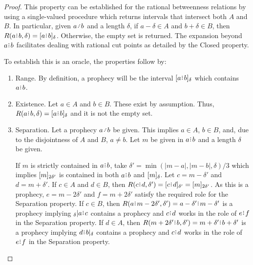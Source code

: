 \documentclass[12pt]{article}
\begin{document}
\begin{proof}
This property can be established for the rational betweenness relations by using a single-valued procedure which returns intervals that intersect both $A$ and $B$. In particular, given $a \lte b$ and a length $\delta$, if $a-\delta \in A$ and $b+\delta \in B$, then $R(a\rint b, \delta) = \halo{a\rint b}$. Otherwise, the empty set is returned. The expansion beyond $a\rint b$ facilitates dealing with rational cut points as detailed by the Closed property. 

To establish this is an oracle, the properties follow by:  
\begin{enumerate}
    \item Range. By definition, a prophecy will be the interval $\halo{a\rint b}$ which contains $a\rint b$. 
    
    \item Existence. Let $a \in A$ and $b \in B$. These exist by assumption. Thus, $R(a\rint b, \delta)= \halo{a\rint b}$  and it is not the empty set.
    
    \item Separation. Let a prophecy $a \lte b$ be given. This implies $a \in A$, $b \in B$, and, due to the disjointness of $A$ and $B$, $a \neq b$. Let $m$ be given in $a\rint b$ and a length $\delta$ be given. 
    
    If $m$ is strictly contained in $a\rint b$, take $\delta'= \min(|m-a|, |m-b|, \delta)/3$ which implies $\halo[2\delta']{m}$ is contained in both $a\rint b$ and $\halo{m}$.  Let $c = m-\delta'$ and $d=m+\delta'$. If $c \in A$ and $d \in B$, then $R(c\rint d, \delta') = \halo[\delta']{c\rint d} = \halo[2 \delta']{m}$. As this is a prophecy, $e = m - 2 \delta'$ and $f = m + 2 \delta'$ satisfy the required role for the Separation property. If $ c\in B$, then $R(a\rint m-2\delta', \delta') = a-\delta'\rint m-\delta'$ is a prophecy implying ${}_\delta| a \rint  c$ contains a prophecy and $c\rint d$ works in the role of $e\rint f$ in the Separation property. If $d \in A$, then $R(m+2\delta'\rint b, \delta') = m+\delta'\rint b+\delta'$ is a prophecy implying $d\rint b|_{\delta}$ contains a prophecy and $c\rint d$ works in the role of $e\rint f$ in the Separation property. 


\end{enumerate}
\end{proof}
\end{document}
